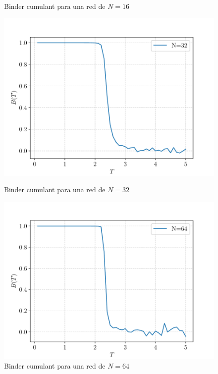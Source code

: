 \documentclass[11pt,a4paper]{article}
\begin{document}
\begin{figure}[H]
\begin{minipage}{0.45\textwidth}
        \caption{Binder cumulant para una red de $N = 16$}
        \label{fig:p4_6}
    \end{minipage}
    \vfill
    \begin{minipage}{0.45\textwidth}
        \centering
        \includegraphics[width=\textwidth]{p4/N32_binder.pdf}
        \caption{Binder cumulant para una red de $N = 32$}
        \label{fig:p4_7}
    \end{minipage}
    \hfill
    \begin{minipage}{0.45\textwidth}
        \centering
        \includegraphics[width=\textwidth]{p4/N64_binder.pdf}
        \caption{Binder cumulant para una red de $N = 64$}
        \label{fig:p4_8}
    \end{minipage}
\end{figure}
\end{document}
